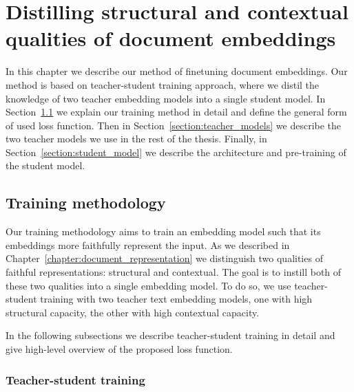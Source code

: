 \chapter{Distilling structural and contextual qualities of document
embeddings}\label{chapter:training_method}

In this chapter we describe our method of finetuning document embeddings. Our
method is based on teacher-student training approach, where we distil the
knowledge of two teacher embedding models into a single student model. In
Section~\ref{section:training_method} we explain our training method in detail
and define the general form of used loss function. Then in
Section~\ref{section:teacher_models} we describe the two teacher models we use
in the rest of the thesis. Finally, in Section~\ref{section:student_model} we
describe the architecture and pre-training of the student model.

\section{Training methodology}\label{section:training_method}


Our training methodology aims to train an embedding model such that its
embeddings more faithfully represent the input. As we described in
Chapter~\ref{chapter:document_representation} we distinguish two qualities of
faithful representations: structural and contextual. The goal is to instill
both of these two qualities into a single embedding model. To do so, we use
teacher-student training with two teacher text embedding models, one with high
structural capacity, the other with high contextual capacity.

In the following subsections we describe teacher-student training in detail and
give high-level overview of the proposed loss function.

\subsection{Teacher-student training}

